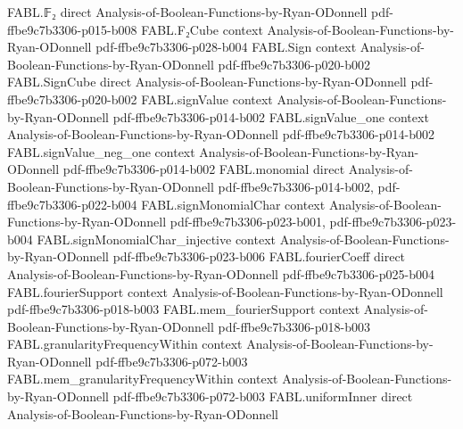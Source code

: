 \begin{theorem}
\label{FABL.allZeroStringTester_isLocalTester}
\leanok
{}
\proofstep
  {FABL.𝔽₂}
  {direct}
  {Analysis-of-Boolean-Functions-by-Ryan-ODonnell}
  {pdf-ffbe9c7b3306-p015-b008}
\proofstep
  {FABL.F₂Cube}
  {context}
  {Analysis-of-Boolean-Functions-by-Ryan-ODonnell}
  {pdf-ffbe9c7b3306-p028-b004}
\proofstep
  {FABL.Sign}
  {context}
  {Analysis-of-Boolean-Functions-by-Ryan-ODonnell}
  {pdf-ffbe9c7b3306-p020-b002}
\proofstep
  {FABL.SignCube}
  {direct}
  {Analysis-of-Boolean-Functions-by-Ryan-ODonnell}
  {pdf-ffbe9c7b3306-p020-b002}
\proofstep
  {FABL.signValue}
  {context}
  {Analysis-of-Boolean-Functions-by-Ryan-ODonnell}
  {pdf-ffbe9c7b3306-p014-b002}
\proofstep
  {FABL.signValue_one}
  {context}
  {Analysis-of-Boolean-Functions-by-Ryan-ODonnell}
  {pdf-ffbe9c7b3306-p014-b002}
\proofstep
  {FABL.signValue_neg_one}
  {context}
  {Analysis-of-Boolean-Functions-by-Ryan-ODonnell}
  {pdf-ffbe9c7b3306-p014-b002}
\proofstep
  {FABL.monomial}
  {direct}
  {Analysis-of-Boolean-Functions-by-Ryan-ODonnell}
  {pdf-ffbe9c7b3306-p014-b002,
    pdf-ffbe9c7b3306-p022-b004}
\proofstep
  {FABL.signMonomialChar}
  {context}
  {Analysis-of-Boolean-Functions-by-Ryan-ODonnell}
  {pdf-ffbe9c7b3306-p023-b001,
    pdf-ffbe9c7b3306-p023-b004}
\proofstep
  {FABL.signMonomialChar_injective}
  {context}
  {Analysis-of-Boolean-Functions-by-Ryan-ODonnell}
  {pdf-ffbe9c7b3306-p023-b006}
\proofstep
  {FABL.fourierCoeff}
  {direct}
  {Analysis-of-Boolean-Functions-by-Ryan-ODonnell}
  {pdf-ffbe9c7b3306-p025-b004}
\proofstep
  {FABL.fourierSupport}
  {context}
  {Analysis-of-Boolean-Functions-by-Ryan-ODonnell}
  {pdf-ffbe9c7b3306-p018-b003}
\proofstep
  {FABL.mem_fourierSupport}
  {context}
  {Analysis-of-Boolean-Functions-by-Ryan-ODonnell}
  {pdf-ffbe9c7b3306-p018-b003}
\proofstep
  {FABL.granularityFrequencyWithin}
  {context}
  {Analysis-of-Boolean-Functions-by-Ryan-ODonnell}
  {pdf-ffbe9c7b3306-p072-b003}
\proofstep
  {FABL.mem_granularityFrequencyWithin}
  {context}
  {Analysis-of-Boolean-Functions-by-Ryan-ODonnell}
  {pdf-ffbe9c7b3306-p072-b003}
\proofstep
  {FABL.uniformInner}
  {direct}
  {Analysis-of-Boolean-Functions-by-Ryan-ODonnell}

\end{theorem}
